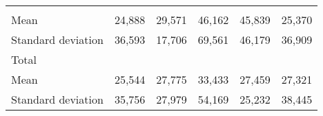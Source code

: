 \begin{tabular}{llllll}
  \multicolumn{1}{r}{} &
  \multicolumn{1}{r}{} &
  \multicolumn{1}{r}{} &
  \multicolumn{1}{r}{} \\
\multicolumn{1}{l}{\hspace{4em}Mean} &
  \multicolumn{1}{|r}{24,888} &
  \multicolumn{1}{r}{29,571} &
  \multicolumn{1}{r}{46,162} &
  \multicolumn{1}{r}{45,839} &
  \multicolumn{1}{r}{25,370} \\
\multicolumn{1}{l}{\hspace{4em}Standard deviation} &
  \multicolumn{1}{|r}{36,593} &
  \multicolumn{1}{r}{17,706} &
  \multicolumn{1}{r}{69,561} &
  \multicolumn{1}{r}{46,179} &
  \multicolumn{1}{r}{36,909} \\
\multicolumn{1}{l}{\hspace{3em}Total} &
  \multicolumn{1}{|r}{} &
  \multicolumn{1}{r}{} &
  \multicolumn{1}{r}{} &
  \multicolumn{1}{r}{} &
  \multicolumn{1}{r}{} \\
\multicolumn{1}{l}{\hspace{4em}Mean} &
  \multicolumn{1}{|r}{25,544} &
  \multicolumn{1}{r}{27,775} &
  \multicolumn{1}{r}{33,433} &
  \multicolumn{1}{r}{27,459} &
  \multicolumn{1}{r}{27,321} \\
\multicolumn{1}{l}{\hspace{4em}Standard deviation} &
  \multicolumn{1}{|r}{35,756} &
  \multicolumn{1}{r}{27,979} &
  \multicolumn{1}{r}{54,169} &
  \multicolumn{1}{r}{25,232} &
  \multicolumn{1}{r}{38,445} \\
\cline{1-6}
\end{tabular}

